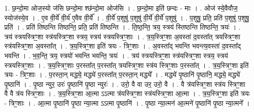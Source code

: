 \documentclass[17pt]{extarticle}
\begin{document}
1. छ॒न्दो॒मा ओज॒स्यो ज॑सि छन्दो॒मा श्छ॑न्दो॒मा ओज॑सि । . छ॒न्दो॒मा इति॑ छन्दः - माः । . ओज॑ स्ये॒वैवौज॒ स्योज॑स्ये॒व । . ए॒व वी॒र्ये॑ वी॒र्य॑ ए॒वैव वी॒र्ये᳚ । . वी॒र्ये॑ प॒शुषु॑ प॒शुषु॑ वी॒र्ये॑ वी॒र्ये॑ प॒शुषु॑ । . प॒शुषु॒ प्रति॒ प्रति॑ प॒शुषु॑ प॒शुषु॒ प्रति॑ । . प्रति॑ तिष्ठन्ति तिष्ठन्ति॒ प्रति॒ प्रति॑ तिष्ठन्ति । . ति॒ष्ठ॒न्ति॒ त्रय॒ स्त्रय॑ स्तिष्ठन्ति तिष्ठन्ति॒ त्रयः॑ । . त्रय॑ स्त्रयस्त्रिꣳ॒॒शा स्त्र॑यस्त्रिꣳ॒॒शा स्त्रय॒ स्त्रय॑ स्त्रयस्त्रिꣳ॒॒शाः । . त्र॒य॒स्त्रिꣳ॒॒शा अ॒वस्ता॑ द॒वस्ता᳚त् त्रयस्त्रिꣳ॒॒शा स्त्र॑यस्त्रिꣳ॒॒शा अ॒वस्ता᳚त् । . त्र॒य॒स्त्रिꣳ॒॒शा इति॑ त्रयः - त्रिꣳ॒॒शाः । . अ॒वस्ता᳚द् भवन्ति भवन्त्य॒वस्ता॑ द॒वस्ता᳚द् भवन्ति । . भ॒व॒न्ति॒ त्रय॒ स्त्रयो॑ भवन्ति भवन्ति॒ त्रयः॑ । . त्रय॑ स्त्रयस्त्रिꣳ॒॒शा स्त्र॑यस्त्रिꣳ॒॒शा स्त्रय॒ स्त्रय॑ स्त्रयस्त्रिꣳ॒॒शाः । . त्र॒य॒स्त्रिꣳ॒॒शाः प॒रस्ता᳚त् प॒रस्ता᳚त् त्रयस्त्रिꣳ॒॒शा स्त्र॑य स्त्रिꣳ॒॒शाः प॒रस्ता᳚त् । . त्र॒य॒स्त्रिꣳ॒॒शा इति॑ त्रयः - त्रिꣳ॒॒शाः । . प॒रस्ता॒न् मद्ध्ये॒ मद्ध्ये॑ प॒रस्ता᳚त् प॒रस्ता॒न् मद्ध्ये᳚ । . मद्ध्ये॑ पृ॒ष्ठानि॑ पृ॒ष्ठानि॒ मद्ध्ये॒ मद्ध्ये॑ पृ॒ष्ठानि॑ । . पृ॒ष्ठा न्युर॒ उरः॑ पृ॒ष्ठानि॑ पृ॒ष्ठा न्युरः॑ । . उरो॒ वै वा उर॒ उरो॒ वै । . वै त्र॑यस्त्रिꣳ॒॒शा स्त्र॑य स्त्रिꣳ॒॒शा वै वै त्र॑य स्त्रिꣳ॒॒शाः । . त्र॒य॒स्त्रिꣳ॒॒शा आ॒त्मा ऽऽत्मा त्र॑यस्त्रिꣳ॒॒शा स्त्र॑यस्त्रिꣳ॒॒शा आ॒त्मा । . त्र॒य॒स्त्रिꣳ॒॒शा इति॑ त्रयः - त्रिꣳ॒॒शाः । . आ॒त्मा पृ॒ष्ठानि॑ पृ॒ष्ठा न्या॒त्मा ऽऽत्मा पृ॒ष्ठानि॑ । . पृ॒ष्ठा न्या॒त्मन॑ आ॒त्मने॑ पृ॒ष्ठानि॑ पृ॒ष्ठा न्या॒त्मने᳚ । \newline
\end{document}
